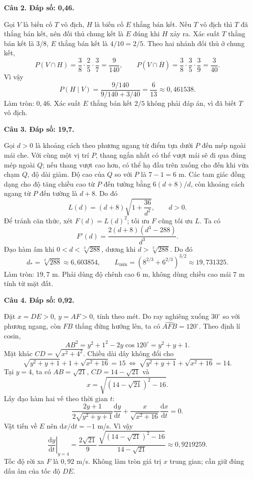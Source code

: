 \documentclass[12pt,a4paper]{article}
\newcommand{\loigiai}[1]{\par\medskip\Needspace{4\baselineskip}\noindent\textbf{#1}\par\nobreak}
\begin{document}
\loigiai{Câu 2. Đáp số: 0,46.}
Gọi $V$ là biến cố $T$ vô địch, $H$ là biến cố $E$ thắng bán kết. Nếu $T$ vô địch thì $T$ đã thắng bán kết, nên đối thủ chung kết là $E$ đúng khi $H$ xảy ra.
Xác suất $T$ thắng bán kết là $3/8$, $E$ thắng bán kết là $4/10=2/5$. Theo hai nhánh đối thủ ở chung kết,
\[P(V\cap H)=\frac38\cdot\frac25\cdot\frac37=\frac9{140},\qquad
P(V\cap\overline H)=\frac38\cdot\frac35\cdot\frac39=\frac3{40}.\]
Vì vậy
\[P(H\mid V)=\frac{9/140}{9/140+3/40}=\frac6{13}\approx0{,}461538.\]
Làm tròn: $0{,}46$. Xác suất $E$ thắng bán kết $2/5$ không phải đáp án, vì đã biết $T$ vô địch.

\loigiai{Câu 3. Đáp số: 19,7.}
Gọi $d>0$ là khoảng cách theo phương ngang từ điểm tựa dưới $P$ đến mép ngoài mái che. Với cùng một vị trí $P$, thang ngắn nhất có thể vượt mái sẽ đi qua đúng mép ngoài $Q$; nếu thang vượt cao hơn, có thể hạ đầu trên xuống cho đến khi vừa chạm $Q$, độ dài giảm.
Độ cao của $Q$ so với $P$ là $7-1=6$ m. Các tam giác đồng dạng cho độ tăng chiều cao từ $P$ đến tường bằng $6(d+8)/d$, còn khoảng cách ngang từ $P$ đến tường là $d+8$. Do đó
\[L(d)=(d+8)\sqrt{1+\frac{36}{d^2}},\qquad d>0.\]
Để tránh căn thức, xét $F(d)=L(d)^2$; tối ưu $F$ cũng tối ưu $L$. Ta có
\[F'(d)=\frac{2(d+8)(d^3-288)}{d^3}.\]
Đạo hàm âm khi $0<d<\sqrt[3]{288}$, dương khi $d>\sqrt[3]{288}$. Do đó
\[d_* =\sqrt[3]{288}\approx6{,}603854,\qquad
L_{\min}=\left(8^{2/3}+6^{2/3}\right)^{3/2}\approx19{,}731325.\]
Làm tròn: $19{,}7$ m. Phải dùng độ chênh cao $6$ m, không dùng chiều cao mái $7$ m tính từ mặt đất.

\loigiai{Câu 4. Đáp số: 0,92.}
Đặt $x=DE>0$, $y=AF>0$, tính theo mét. Do ray nghiêng xuống $30^\circ$ so với phương ngang, còn $FB$ thẳng đứng hướng lên, ta có $\widehat{AFB}=120^\circ$. Theo định lí cosin,
\[AB^2=y^2+1^2-2y\cos120^\circ=y^2+y+1.\]
Mặt khác $CD=\sqrt{x^2+4^2}$. Chiều dài dây không đổi cho
\[\sqrt{y^2+y+1}+1+\sqrt{x^2+16}=15
\ \Longleftrightarrow\ \sqrt{y^2+y+1}+\sqrt{x^2+16}=14.\]
Tại $y=4$, ta có $AB=\sqrt{21}$, $CD=14-\sqrt{21}$ và
\[x=\sqrt{(14-\sqrt{21})^2-16}.\]
Lấy đạo hàm hai vế theo thời gian $t$:
\[\frac{2y+1}{2\sqrt{y^2+y+1}}\frac{\mathrm dy}{\mathrm dt}
+\frac{x}{\sqrt{x^2+16}}\frac{\mathrm dx}{\mathrm dt}=0.\]
Vật tiến về $E$ nên $\mathrm dx/\mathrm dt=-1$ m/s. Vì vậy
\[\left.\frac{\mathrm dy}{\mathrm dt}\right|_{y=4}
=\frac{2\sqrt{21}}9\,
\frac{\sqrt{(14-\sqrt{21})^2-16}}{14-\sqrt{21}}
\approx0{,}9219259.\]
Tốc độ rời xa $F$ là $0{,}92$ m/s. Không làm tròn giá trị $x$ trung gian; cần giữ đúng dấu âm của tốc độ $DE$.
\end{document}
